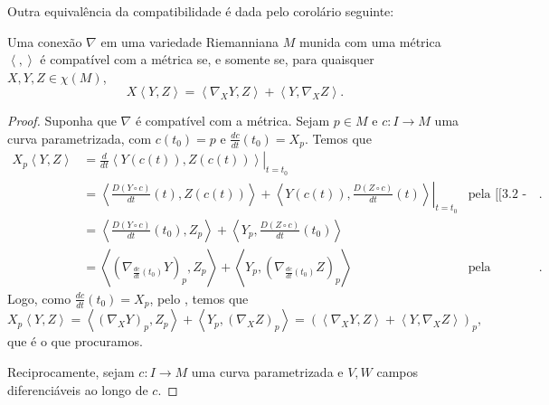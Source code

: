 Outra equivalência da compatibilidade é dada pelo corolário seguinte:
\begin{corollary}
    \label{loc:3.3_:_corolário_1_:_compatível_se_e_só_se_vale_leibniz_direcional}
    Uma conexão $\nabla$ em uma variedade Riemanniana $M$ munida com uma métrica $\left<,\right>$ é compatível com a métrica se, e somente se, para quaisquer $X, Y, Z \in \chi(M)$,
    \begin{equation*}
        X\left<Y,Z\right> =\left<\nabla_{X}Y,Z\right> +\left<Y,\nabla_{X}Z\right> . \tag{$*$}
    \end{equation*}
    \begin{proof}

        Suponha que $\nabla$ é compatível com a métrica. Sejam $p \in M$ e $c:I\to M$ uma curva parametrizada, com $c(t_{0})=p$ e $\frac{dc}{dt}(t_{0})=X_{p}$. Temos que
        \begin{align*}
            X_{p}\left<Y,Z\right> & =\left.\frac{d}{dt}\left<Y(c(t)),Z(c(t))\right>\right|_{t=t_{0}}                                                                                                                                               \\
                                  & =\left<\left.\frac{D(Y \circ  c)}{dt}(t),Z(c(t))\right> +\left<Y(c(t)),\frac{D(Z \circ c)}{dt}(t)\right> \right|_{t=t_{0}}                   & \text{pela [[3.2 - Prop 3 - Leibniz para conexão compatível]]}. \\
                                  & =\left<\frac{D(Y \circ  c)}{dt}(t_{0}),Z_{p}\right> +\left<Y_{p},\frac{D(Z \circ c)}{dt}(t_{0})\right>                                                                                                         \\
                                  & = \left<\left( \nabla_{\frac{dc}{dt}(t_{0})}Y \right)_{p},Z_{p}\right> +\left<Y_{p},\left( \nabla_{\frac{dc}{dt}(t_{0})}Z \right)_{p}\right> & \text{pela definição de conexão}.
        \end{align*}
        Logo, como $\frac{dc}{dt}(t_{0})=X_{p}$, pelo , temos que
        \begin{equation*}
            X_{p}\left<Y,Z\right> =\left<(\nabla_{X}Y)_{p},Z_{p}\right> + \left<Y_{p},(\nabla _{X}Z)_{p}\right> =(\left<\nabla_{X}Y,Z\right> +\left<Y,\nabla_{X}Z\right> )_{p},
        \end{equation*}
        que é o que procuramos.

        Reciprocamente, sejam $c:I\to M$ uma curva parametrizada e $V, W$ campos diferenciáveis ao longo de $c$.


\end{proof}
\end{corollary}
